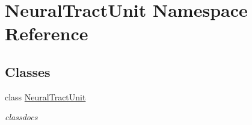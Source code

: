 \hypertarget{namespace_neural_tract_unit}{\section{Neural\-Tract\-Unit Namespace Reference}
\label{namespace_neural_tract_unit}
}
\subsection*{Classes}
\begin{DoxyCompactItemize}
\item 
class \hyperlink{class_neural_tract_unit_1_1_neural_tract_unit}{Neural\-Tract\-Unit}
\begin{DoxyCompactList}\small\item\em classdocs \end{DoxyCompactList}\end{DoxyCompactItemize}
